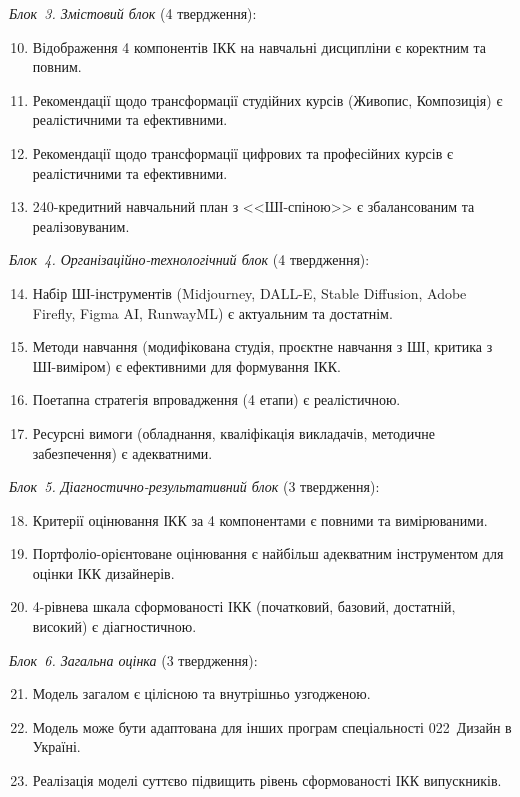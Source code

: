 \textit{Блок~3. Змістовий блок} (4 твердження):
\begin{enumerate}
    \setcounter{enumi}{9}
    \item Відображення 4 компонентів ІКК на навчальні дисципліни є коректним та повним.
    \item Рекомендації щодо трансформації студійних курсів (Живопис, Композиція) є реалістичними та ефективними.
    \item Рекомендації щодо трансформації цифрових та професійних курсів є реалістичними та ефективними.
    \item 240-кредитний навчальний план з <<ШІ-спіною>> є збалансованим та реалізовуваним.
\end{enumerate}

\textit{Блок~4. Організаційно-технологічний блок} (4 твердження):
\begin{enumerate}
    \setcounter{enumi}{13}
    \item Набір ШІ-інструментів (Midjourney, DALL-E, Stable Diffusion, Adobe Firefly, Figma AI, RunwayML) є актуальним та достатнім.
    \item Методи навчання (модифікована студія, проєктне навчання з ШІ, критика з ШІ-виміром) є ефективними для формування ІКК.
    \item Поетапна стратегія впровадження (4 етапи) є реалістичною.
    \item Ресурсні вимоги (обладнання, кваліфікація викладачів, методичне забезпечення) є адекватними.
\end{enumerate}

\textit{Блок~5. Діагностично-результативний блок} (3 твердження):
\begin{enumerate}
    \setcounter{enumi}{17}
    \item Критерії оцінювання ІКК за 4 компонентами є повними та вимірюваними.
    \item Портфоліо-орієнтоване оцінювання є найбільш адекватним інструментом для оцінки ІКК дизайнерів.
    \item 4-рівнева шкала сформованості ІКК (початковий, базовий, достатній, високий) є діагностичною.
\end{enumerate}

\textit{Блок~6. Загальна оцінка} (3 твердження):
\begin{enumerate}
    \setcounter{enumi}{20}
    \item Модель загалом є цілісною та внутрішньо узгодженою.
    \item Модель може бути адаптована для інших програм спеціальності 022~Дизайн в Україні.
    \item Реалізація моделі суттєво підвищить рівень сформованості ІКК випускників.
\end{enumerate}

